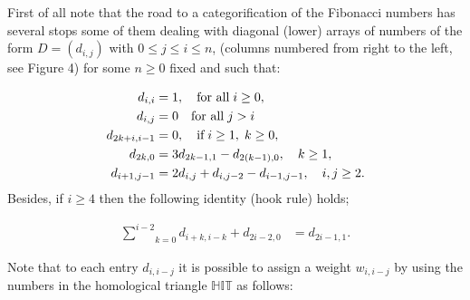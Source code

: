 \documentclass[10pt,twoside]{article}
\theoremstyle{definition}
\begin{document}
First of all note that the road to a categorification of the Fibonacci numbers has several stops some of them dealing with diagonal (lower) arrays of numbers of the form $D=(d_{i, j})$ with $0\leq j\leq i\leq n$, (columns numbered from right to the left, see Figure 4) for some $n\geq0$ fixed and such that:
\par\bigskip
\addtocounter{equation}{1}
\begin{equation}\label{farray}
\begin{split}
d_{i,i}&=1, \quad\text{for all}\hspace{0.1cm}i\geq0,\\
d_{i,j}&=0 \quad\text{for all}\hspace{0.1cm}j>i\\
d_{2k+i, i-1}&=0, \quad\text{if}\hspace{0.1cm}i\geq 1, \hspace{0.1cm}k\geq 0,\\
d_{2k, 0}&=3d_{2k-1, 1}-d_{2(k-1), 0},\quad k\geq 1,\\
d_{i+1, j-1}&=2d_{i, j}+d_{i, j-2}-d_{i-1, j-1},\quad i, j\geq2.\\
\end{split}
\end{equation}
Besides, if $i \geq 4$ then the following identity (hook rule) holds;

\begin{equation}
\begin{split}
\underset{k=0}{\overset{i-2}{\sum}}d_{i+k, i-k}+d_{2i-2, 0}&=d_{2i-1, 1}.
\end{split}
\end{equation}


Note that to each entry $d_{i, i-j}$ it is possible to assign a weight $w_{i, i- j}$ by using the numbers in the homological triangle $\mathbb{HIT}$ as follows:
\end{document}
